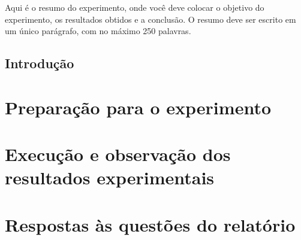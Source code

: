 \documentclass[11pt,openright,oneside,a4paper,brazil,english]{abntex2}
\renewcommand{\imprimircapa}{%
    \begin{capa}%
        \center
        {\ABNTEXchapterfont\Large\imprimirinstituicao\par}
        \vspace{0.8cm}

        {\ABNTEXchapterfont\large\imprimirautor\par}
        \vfill

        {\ABNTEXchapterfont\bfseries\LARGE\imprimirtitulo\par}
        \vfill

        {\ABNTEXchapterfont\large\imprimirlocal\par}
        {\ABNTEXchapterfont\large\imprimirdata\par}
    \end{capa}%
}
\begin{document}

\frenchspacing 

\imprimircapa

\begin{resumo}
Aqui é o resumo do experimento, onde você deve colocar o objetivo do experimento, os resultados obtidos e a conclusão. O resumo deve ser escrito em um único parágrafo, com no máximo 250 palavras.
\end{resumo}



\tableofcontents*
\cleardoublepage


\textual


\chapter{Introdução}

\part{Preparação para o experimento}

\part{Execução e observação dos resultados experimentais}

\part{Respostas às questões do relatório}
\end{document}
